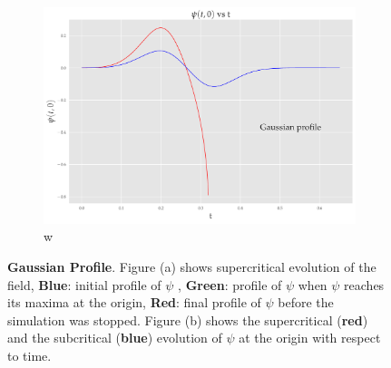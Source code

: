 \begin{figure}
    \begin{subfigure}[b]{0.85\textwidth}
        \includegraphics[width=1\linewidth]{images/at0_Gaussian.pdf}w
        \caption{}
        \label{fig:Ng2}
    \end{subfigure}
    \caption[Evolution of $\psi$ from an initial Gaussian profile]{\textbf{Gaussian Profile}. Figure (a) shows supercritical evolution of the field, \textbf{Blue}: initial profile of $\psi$ , \textbf{Green}: profile of $\psi$ when $\psi$ reaches its maxima at the origin, \textbf{Red}: final profile of $\psi$ before the simulation was stopped. Figure (b) shows the supercritical (\textbf{red}) and the subcritical (\textbf{blue}) evolution of $\psi$ at the origin with respect to time.}
\end{figure}




